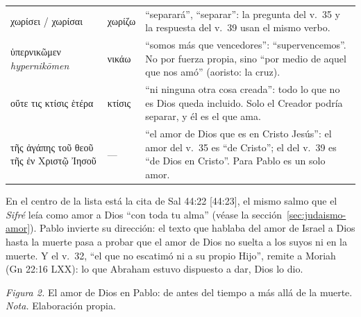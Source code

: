 \documentclass[11pt,letterpaper]{article}
\newcommand{\grc}[1]{\foreignlanguage{ancientgreek}{#1}}
\begin{document}
\begin{filologia}[Ro 8:35--39]
\begin{tabular}{@{}L{3.6cm}L{1.6cm}L{9.6cm}@{}}
\grc{χωρίσει} / \grc{χωρίσαι} & \grc{χωρίζω} & ``separará'', ``separar'': la pregunta del v.~35 y la respuesta del v.~39 usan el mismo verbo. \\[2pt]
\grc{ὑπερνικῶμεν} \emph{hypernikōmen} & \grc{νικάω} & ``somos más que vencedores'': ``supervencemos''. No por fuerza propia, sino ``por medio de aquel que nos amó'' (aoristo: la cruz). \\[2pt]
\grc{οὔτε τις κτίσις ἑτέρα} & \grc{κτίσις} & ``ni ninguna otra cosa creada'': todo lo que no es Dios queda incluido. Solo el Creador podría separar, y él es el que ama. \\[2pt]
\grc{τῆς ἀγάπης τοῦ θεοῦ τῆς ἐν Χριστῷ Ἰησοῦ} & --- & ``el amor de Dios que es en Cristo Jesús'': el amor del v.~35 es ``de Cristo''; el del v.~39 es ``de Dios en Cristo''. Para Pablo es un solo amor. \\
\end{tabular}
\end{filologia}

En el centro de la lista está la cita de Sal 44:22 [44:23], el mismo salmo que el \emph{Sifré} leía como amor a Dios ``con toda tu alma'' (véase la sección~\ref{sec:judaismo-amor}). Pablo invierte su dirección: el texto que hablaba del amor de Israel a Dios hasta la muerte pasa a probar que el amor de Dios no suelta a los suyos ni en la muerte. Y el v.~32, ``el que no escatimó ni a su propio Hijo'', remite a Moriah (Gn 22:16 LXX): lo que Abraham estuvo dispuesto a dar, Dios lo dio.

\begin{center}
\par
{\footnotesize\color{gris}\textit{Figura 2.} El amor de Dios en Pablo: de antes del tiempo a más allá de la muerte. \textit{Nota.} Elaboración propia.}
\end{center}
\end{document}
